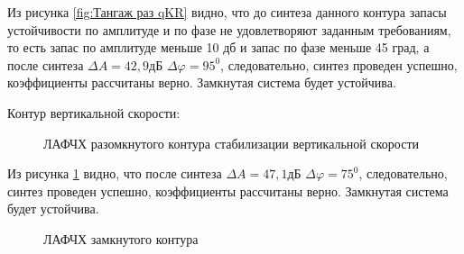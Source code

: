 Из рисунка \ref{fig:Тангаж раз qKR} видно, что до синтеза данного контура запасы устойчивости по амплитуде и по фазе не удовлетворяют заданным требованиям, то есть запас по амплитуде меньше 10 дб и запас по фазе меньше 45 град, а после синтеза $\Delta A = 42,9 $дБ $\Delta \varphi = 95^0$, следовательно, синтез проведен успешно, коэффициенты рассчитаны верно. Замкнутая система будет устойчива.  

\begin{center}
    Контур вертикальной скорости:
\end{center}

\begin{figure}[H]
    \caption{ЛАФЧХ разомкнутого контура стабилизации вертикальной скорости}
    \label{fig:Вертикальная скорость раз qKR}
\end{figure}

Из рисунка \ref{fig:Вертикальная скорость раз qKR} видно, что после синтеза $\Delta A = 47,1 $дБ $\Delta \varphi = 75^0$, следовательно, синтез проведен успешно, коэффициенты рассчитаны верно. Замкнутая система будет устойчива.  

\begin{figure}[H]
    \caption{ЛАФЧХ замкнутого контура }
    \label{fig:Вертикальная скорость зам qKR}
\end{figure}

